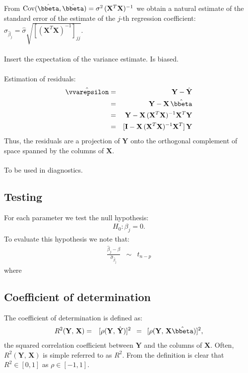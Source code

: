 \documentclass[a4paper]{article}
\theoremstyle{myexamplestyle}
\begin{document}
From $\mbox{Cov}(\hat{\bbeta}, \hat{\bbeta}) = \sigma^2 \, (\mathbf{X}^T \mathbf{X})^{-1}$ we obtain a natural estimate of the standard error of the estimate of the $j$-th regression coefficient: $\hat{\sigma}_{\hat{\beta}_j}  =  \hat{\sigma} \sqrt{ [(\mathbf{X}^T \mathbf{X})^{-1}]_{jj} }$.
\\
\\
Insert the expectation of the variance estimate. Is biased.
\\
\\
Estimation of residuals:
\begin{eqnarray*}
\hat{\vvarepsilon} & = & \mathbf{Y} - \hat{\mathbf{Y}}
\\
& = & \mathbf{Y} - \mathbf{X} \, \hat{\bbeta}
\\
& = & \mathbf{Y} - \mathbf{X} \, (\mathbf{X}^T \mathbf{X})^{-1} \mathbf{X}^T \mathbf{Y}
\\
& = & [ \mathbf{I} - \mathbf{X} \, (\mathbf{X}^T \mathbf{X})^{-1} \mathbf{X}^T ] \, \mathbf{Y}
\end{eqnarray*}
Thus, the residuals are a projection of $\mathbf{Y}$ onto the orthogonal complement of space spanned by the columns of $\mathbf{X}$.
\\
\\
To be used in diagnostics.


\subsection{Testing}
For each parameter we test the null hypothesis:
\begin{eqnarray*}
H_0 : \beta_j = 0.
\end{eqnarray*}
To evaluate this hypothesis we note that:
\begin{eqnarray*}
\frac{\hat{\beta}_j - \beta}{\hat{\sigma}_{\hat{\beta}_j}} & \sim & t_{n-p}
\end{eqnarray*}
where 


\subsection{Coefficient of determination}
The coefficient of determination is defined as:
\begin{eqnarray*}
R^2(\mathbf{Y}, \, \mathbf{X}) & = & [ \rho(\mathbf{Y}, \, \hat{\mathbf{Y}}) ]^2
\, \, \, = \, \, \, [ \rho(\mathbf{Y}, \, \mathbf{X} \hat{\bbeta}) ]^2,
\end{eqnarray*}
the squared correlation coefficient between $\mathbf{Y}$ and the columns of $\mathbf{X}$.
Often, $R^2(\mathbf{Y}, \, \mathbf{X})$ is simple referred to as $R^2$. From the definition is clear that $R^2 \in [0,1]$ as $\rho \in [-1, 1]$.
\end{document}
